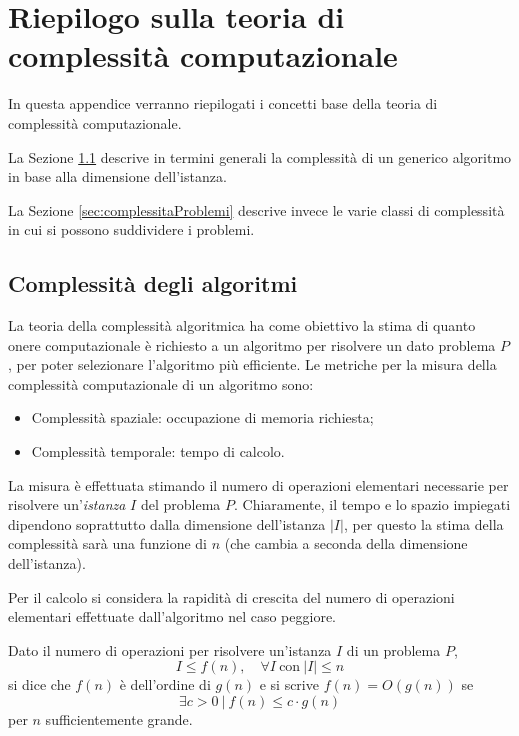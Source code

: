 \appendix
{}
\chapter[Riepilogo complessità computazionale]{Riepilogo sulla teoria di complessità 
computazionale}
\label{chap:appA}
In questa appendice verranno riepilogati i concetti base della teoria di complessità 
computazionale.

La Sezione \ref{sec:complessitaAlgoritmi} descrive in termini generali la 
complessità di un generico algoritmo in base alla dimensione dell'istanza.

La Sezione \ref{sec:complessitaProblemi} descrive invece le varie classi di complessità 
in cui si possono suddividere i problemi.


\section{Complessità degli algoritmi}
\label{sec:complessitaAlgoritmi}
La teoria della complessità algoritmica ha come obiettivo la stima di quanto onere 
computazionale è richiesto a un algoritmo per risolvere un dato problema $P$, per poter 
selezionare l'algoritmo più efficiente. Le metriche per la misura della complessità 
computazionale di un algoritmo sono:
\begin{itemize}
 \item Complessità spaziale: occupazione di memoria richiesta;
 \item Complessità temporale: tempo di calcolo.
\end{itemize}
La misura è effettuata stimando il numero di operazioni elementari necessarie per 
risolvere un'\emph{istanza} $I$ del problema $P$. Chiaramente, il tempo e lo spazio 
impiegati dipendono soprattutto dalla dimensione dell'istanza $\vert I \vert$, per questo 
la stima della complessità sarà una funzione di $n$ (che cambia a seconda della 
dimensione dell'istanza).

Per il calcolo si considera la rapidità di crescita del numero di operazioni elementari 
effettuate dall'algoritmo nel caso peggiore.
\begin{mydef}
\label{def:definizioneComplessita}
Dato il numero di operazioni per 
risolvere un'istanza $I$ di un problema $P$,
\begin{displaymath}
 I \leq f(n), \quad \forall I\  \text{con}\  \vert I \vert \leq n
\end{displaymath}
si dice che $f(n)$ è dell'ordine di $g(n)$ e si scrive $f(n) = O(g(n))$ se
\begin{equation}
 \exists c > 0\  \vert\  f(n) \leq c\cdot g(n)
\end{equation}
per $n$ sufficientemente grande.
\end{mydef}

